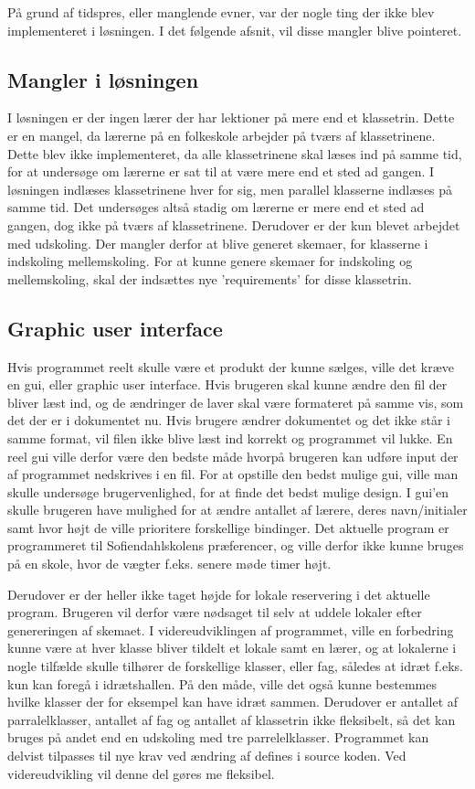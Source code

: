 På grund af tidspres, eller manglende evner, var der nogle ting der ikke blev implementeret i løsningen. I det følgende afsnit, vil disse mangler blive pointeret. 
\subsection{Mangler i løsningen}

I løsningen er der ingen lærer der har lektioner på mere end et klassetrin. Dette er en mangel, da lærerne på en folkeskole arbejder på tværs af klassetrinene. Dette blev ikke implementeret, da alle klassetrinene skal læses ind på samme tid, for at undersøge om lærerne er sat til at være mere end et sted ad gangen. I løsningen indlæses klassetrinene hver for sig, men parallel klasserne indlæses på samme tid. Det undersøges altså stadig om lærerne er mere end et sted ad gangen, dog ikke på tværs af klassetrinene. 
Derudover er der kun blevet arbejdet med udskoling. Der mangler derfor at blive generet skemaer, for klasserne i indskoling mellemskoling. For at kunne genere skemaer for indskoling og mellemskoling, skal der indsættes nye ’requirements’ for disse klassetrin.
\subsection{Graphic user interface}

Hvis programmet reelt skulle være et produkt der kunne sælges, ville det kræve en gui, eller graphic user interface. Hvis brugeren skal kunne ændre den fil der bliver læst ind, og de ændringer de laver skal være formateret på samme vis, som det der er i dokumentet nu. Hvis brugere ændrer dokumentet og det ikke står i samme format, vil filen ikke blive læst ind korrekt og programmet vil lukke. En reel gui ville derfor være den bedste måde hvorpå brugeren kan udføre input der af programmet nedskrives i en fil. For at opstille den bedst mulige gui, ville man skulle undersøge brugervenlighed, for at finde det bedst mulige design. I gui’en skulle brugeren have mulighed for at ændre antallet af lærere, deres navn/initialer samt hvor højt de ville prioritere forskellige bindinger. 
Det aktuelle program er programmeret til Sofiendahlskolens præferencer, og ville derfor ikke kunne bruges på en skole, hvor de vægter f.eks. senere møde timer højt. 


Derudover er der heller ikke taget højde for lokale reservering i det aktuelle program. Brugeren vil derfor være nødsaget til selv at uddele lokaler efter genereringen af skemaet. I videreudviklingen af programmet, ville en forbedring kunne være at hver klasse bliver tildelt et lokale samt en lærer, og at lokalerne i nogle tilfælde skulle tilhører de forskellige klasser, eller fag, således at idræt f.eks. kun kan foregå i idrætshallen. På den måde, ville det også kunne bestemmes hvilke klasser der for eksempel kan have idræt sammen. Derudover er antallet af parralelklasser, antallet af fag og antallet af klassetrin ikke fleksibelt, så det kan bruges på andet end en udskoling med tre parrelelklasser. Programmet kan delvist tilpasses til nye krav ved ændring af defines i source koden. Ved videreudvikling vil denne del gøres me fleksibel.


